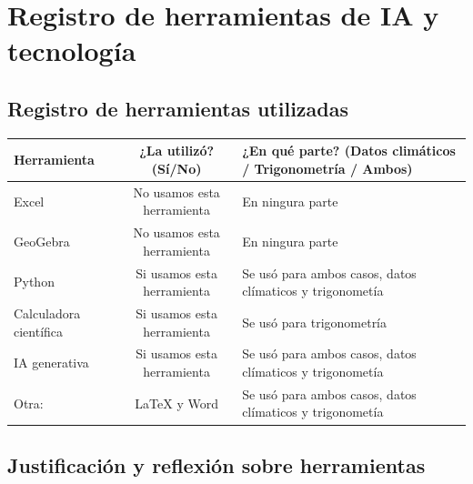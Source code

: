 \documentclass[12pt]{article}
\begin{document}
\newpage

\section{Registro de herramientas de IA y tecnología}

\subsection{Registro de herramientas utilizadas}


\renewcommand{\arraystretch}{2}
\noindent
\begin{tabularx}{\textwidth}{@{} l c X @{}}
\toprule
\textbf{Herramienta} & \textbf{¿La utilizó? (Sí/No)} & \textbf{¿En qué parte? (Datos climáticos / Trigonometría / Ambos)} \\
\midrule
Excel & No usamos esta herramienta & En ningura parte\\
GeoGebra & No usamos esta herramienta & En ningura parte\\
Python & Si usamos esta herramienta & Se usó para ambos casos, datos clímaticos y trigonometía \\
Calculadora científica & Si usamos esta herramienta & Se usó para trigonometría \\
IA generativa & Si usamos esta herramienta & Se usó para ambos casos, datos clímaticos y trigonometía\\
Otra: & LaTeX y Word & Se usó para ambos casos, datos clímaticos y trigonometía\\
\bottomrule
\end{tabularx}

\newpage

\subsection{Justificación y reflexión sobre herramientas}
\end{document}
